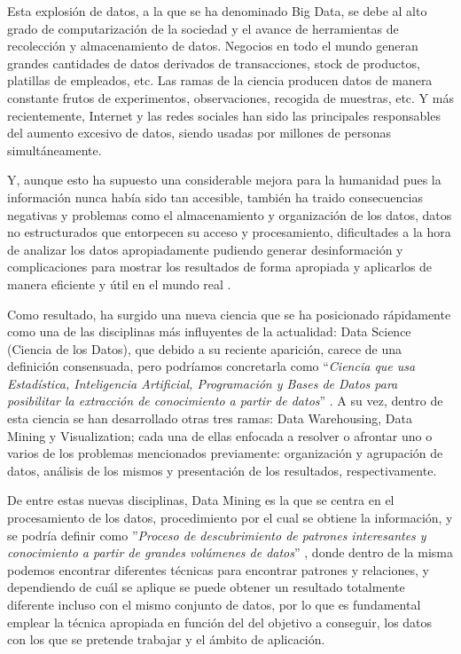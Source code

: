 \documentclass[3p,twocolumn]{elsarticle}
\begin{document}
Esta explosión de datos, a la que se ha denominado Big Data, se debe al alto grado de computarización de la sociedad y el avance de herramientas de recolección y almacenamiento de datos. Negocios en todo el mundo generan grandes cantidades de datos derivados de transacciones, stock de productos,  platillas de empleados, etc. Las ramas de la ciencia producen datos de manera constante frutos de experimentos, observaciones, recogida de muestras, etc. Y más recientemente, Internet y las redes sociales han sido las principales responsables del aumento excesivo de datos, siendo usadas por millones de personas simultáneamente.

Y, aunque esto ha supuesto una considerable mejora para la humanidad pues la información nunca había sido tan accesible, también ha traido consecuencias negativas y problemas como el almacenamiento y organización de los datos, datos no estructurados que entorpecen su acceso y procesamiento, dificultades a la hora de analizar los datos apropiadamente pudiendo generar desinformación y complicaciones para mostrar los resultados de forma apropiada y aplicarlos de manera eficiente y útil en el mundo real \cite{3}.

Como resultado, ha surgido una nueva ciencia que se ha posicionado rápidamente como una de las disciplinas más influyentes de la actualidad: Data Science (Ciencia de los Datos), que debido a su reciente aparición, carece de una definición consensuada, pero podríamos concretarla como ``\textit{Ciencia que usa Estadística, Inteligencia Artificial, Programación y Bases de Datos para posibilitar la extracción de conocimiento a partir de datos}'' \cite{4}. A su vez, dentro de esta ciencia se han desarrollado otras tres ramas: Data Warehousing, Data Mining y Visualization; cada una de ellas enfocada a resolver o afrontar uno o varios de los problemas mencionados previamente: organización y agrupación de datos, análisis de los mismos y presentación de los resultados, respectivamente.

De entre estas nuevas disciplinas, Data Mining es la que se centra en el procesamiento de los datos, procedimiento por el cual se obtiene la información, y se podría definir como ''\textit{Proceso de descubrimiento de patrones interesantes y conocimiento a partir de grandes volúmenes de datos}'' \cite{5}, donde dentro de la misma podemos encontrar diferentes técnicas para encontrar patrones y relaciones, y dependiendo de cuál se aplique se puede obtener un resultado totalmente diferente incluso con el mismo conjunto de datos, por lo que es fundamental emplear la técnica apropiada en función del del objetivo a conseguir, los datos con los que se pretende trabajar y el ámbito de aplicación.
\end{document}
